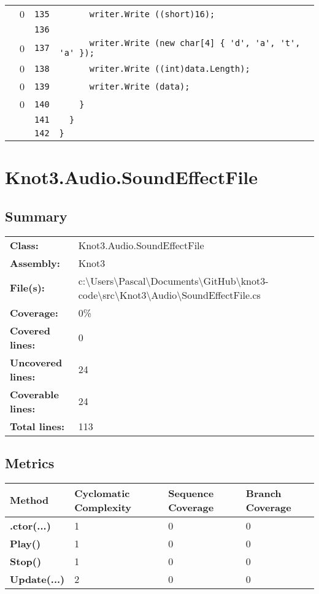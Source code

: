 \documentclass[a4paper,10pt]{article}
\begin{document}
\begin{longtable}[l]{lrrl}
\cellcolor{red} & 0 & \verb~135~ & \verb~      writer.Write ((short)16);~\\
\cellcolor{gray} &  & \verb~136~ & \verb~~\\
\cellcolor{red} & 0 & \verb~137~ & \verb~      writer.Write (new char[4] { 'd', 'a', 't', 'a' });~\\
\cellcolor{red} & 0 & \verb~138~ & \verb~      writer.Write ((int)data.Length);~\\
\cellcolor{red} & 0 & \verb~139~ & \verb~      writer.Write (data);~\\
\cellcolor{red} & 0 & \verb~140~ & \verb~    }~\\
\cellcolor{gray} &  & \verb~141~ & \verb~  }~\\
\cellcolor{gray} &  & \verb~142~ & \verb~}~\\
\end{longtable}
\newpage
\section{Knot3.Audio.SoundEffectFile}
\subsection{Summary}
\begin{longtable}[l]{ll}
\textbf{Class:} & Knot3.Audio.SoundEffectFile\\
\textbf{Assembly:} & Knot3\\
\textbf{File(s):} & \begin{minipage}[t]{12cm}{c:\textbackslash Users\textbackslash Pascal\textbackslash Documents\textbackslash GitHub\textbackslash knot3-code\textbackslash src\textbackslash Knot3\textbackslash Audio\textbackslash SoundEffectFile.cs}\end{minipage} \\
\textbf{Coverage:} & 0\%\\
\textbf{Covered lines:} & 0\\
\textbf{Uncovered lines:} & 24\\
\textbf{Coverable lines:} & 24\\
\textbf{Total lines:} & 113\\
\end{longtable}
\subsection{Metrics}
\begin{longtable}[l]{|l|l|l|l|}
\hline
\textbf{Method} & \textbf{Cyclomatic Complexity} & \textbf{Sequence Coverage} & \textbf{Branch Coverage}\\
\hline
\textbf{.ctor(...)} & 1 & 0 & 0\\
\hline
\textbf{Play()} & 1 & 0 & 0\\
\hline
\textbf{Stop()} & 1 & 0 & 0\\
\hline
\textbf{Update(...)} & 2 & 0 & 0\\
\hline
\end{longtable}
\end{document}
